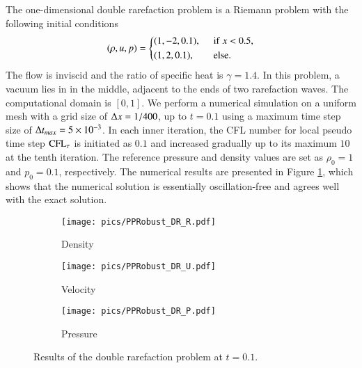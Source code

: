 The one-dimensional double rarefaction problem \cite{hu2004kineticDoubleRare}
is a Riemann problem with the following initial conditions
\begin{equation}
    (\rho,u,p) = \begin{dcases}
        (1,-2,0.1),\ \  & \mathrm{if} \ x < 0.5,       \\
        (1,2,0.1),\ \   & \mathrm{else}.
    \end{dcases}
\end{equation}
The flow is inviscid and the ratio of specific heat is $\gamma=1.4$.
In this problem, a vacuum lies in in the middle, adjacent to the ends of two rarefaction waves.
The computational domain is $[0,1]$.
We perform a numerical simulation on a uniform mesh with a grid size of $\mathrm\Delta x = 1/400$, up to $t=0.1$
 using a maximum time step size of $\mathrm\Delta t_{max}= 5 \times 10 ^{-3}$.
In each inner iteration, the CFL number for local pseudo time step $\text{CFL}_\tau$ is initiated as $0.1$ and
increased gradually up to its maximum $10$ at the tenth iteration.
The reference pressure and density values are set as $\rho_0=1$ and $p_0=0.1$, respectively.
The numerical results are presented in Figure \ref{fig:doubleRare}, which shows that the numerical solution is essentially oscillation-free and agrees well with the exact solution.

\begin{figure}[htbp]
    \centering
    \begin{subfigure}{0.33\textwidth}
        \texttt{[image: pics/PPRobust\_DR\_R.pdf]}
        \caption[]{Density}
    \end{subfigure}\hfill
    \begin{subfigure}{0.33\textwidth}
        \texttt{[image: pics/PPRobust\_DR\_U.pdf]}
        \caption[]{Velocity}
    \end{subfigure}\hfill
    \begin{subfigure}{0.33\textwidth}
        \texttt{[image: pics/PPRobust\_DR\_P.pdf]}
        \caption[]{Pressure}
    \end{subfigure}
    \caption{Results of the double rarefaction problem at $t=0.1$.}
    \label{fig:doubleRare}
\end{figure}

